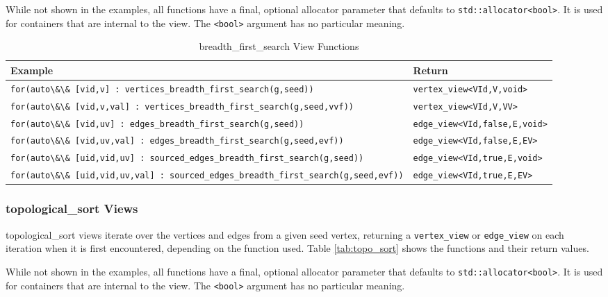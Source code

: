 \documentclass[10pt,onecolumn]{article}
\newcommand{\tcode}[1]{\lstinline[breaklines=true]{#1}}
\begin{document}
While not shown in the examples, all functions have a final, optional allocator parameter that defaults to \tcode{std::allocator<bool>}. It is used for containers that are internal to the view. The \tcode{<bool>} argument has no particular meaning.

\begin{table}[h!]
\begin{center}
\resizebox{\textwidth}{!}
{\begin{tabular}{l l}
\hline
    \textbf{Example} & \textbf{Return} \\
\hline
    \tcode{for(auto\&\& [vid,v] : vertices_breadth_first_search(g,seed))} & \tcode{vertex_view<VId,V,void>} \\
    \tcode{for(auto\&\& [vid,v,val] : vertices_breadth_first_search(g,seed,vvf))} & \tcode{vertex_view<VId,V,VV>} \\
\hline
    \tcode{for(auto\&\& [vid,uv] : edges_breadth_first_search(g,seed))} & \tcode{edge_view<VId,false,E,void>} \\
    \tcode{for(auto\&\& [vid,uv,val] : edges_breadth_first_search(g,seed,evf))} & \tcode{edge_view<VId,false,E,EV>} \\
\hline
    \tcode{for(auto\&\& [uid,vid,uv] : sourced_edges_breadth_first_search(g,seed))} & \tcode{edge_view<VId,true,E,void>} \\
    \tcode{for(auto\&\& [uid,vid,uv,val] : sourced_edges_breadth_first_search(g,seed,evf))} & \tcode{edge_view<VId,true,E,EV>} \\
\hline
\end{tabular}}
\caption{breadth\_first\_search View Functions}
\label{tab:bfs}
\end{center}
\end{table}

\subsubsection{topological\_sort Views}
topological\_sort views iterate over the vertices and edges from a given seed vertex, returning a \tcode{vertex_view} or \tcode{edge_view} on each iteration when it is first encountered, depending on the function used. 
Table \ref{tab:topo_sort} shows the functions and their return values.

While not shown in the examples, all functions have a final, optional allocator parameter that defaults to \tcode{std::allocator<bool>}. It is used for containers that are internal to the view. The \tcode{<bool>} argument has no particular meaning.
\end{document}
